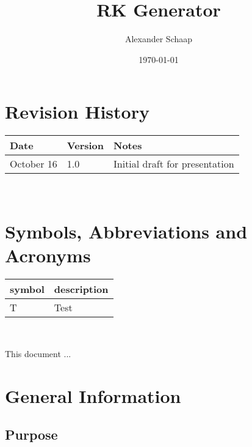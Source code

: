 \documentclass[12pt, titlepage]{article}
\begin{document}
\title{RK Generator} 
\author{Alexander Schaap}
\date{\today}
	
\maketitle


\section{Revision History}

\begin{tabularx}{\textwidth}{p{3cm}p{2cm}X}
\toprule {\bf Date} & {\bf Version} & {\bf Notes}\\
\midrule
October 16 & 1.0 & Initial draft for presentation\\
\bottomrule
\end{tabularx}

~\newpage

\section{Symbols, Abbreviations and Acronyms}

\renewcommand{\arraystretch}{1.2}
\begin{tabular}{l l} 
  \toprule		
  \textbf{symbol} & \textbf{description}\\
  \midrule 
  T & Test\\
  \bottomrule
\end{tabular}\\


\newpage

\tableofcontents

\listoftables

\listoffigures

\newpage


This document ...

\section{General Information}

\subsection{Purpose}
\end{document}
